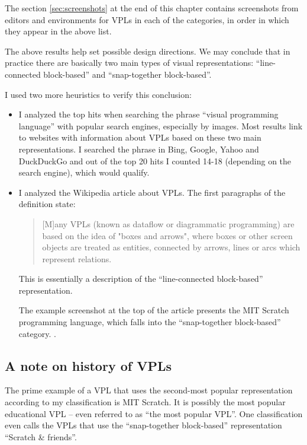 The section \ref{sec:screenshots} at the end of this chapter contains screenshots from editors and environments for VPLs in each of the categories, in order in which they appear in the above list.

The above results help set possible design directions. We may conclude that in practice there are basically two main types of visual representations: ``line-connected block-based'' and ``snap-together block-based''.

I used two more heuristics to verify this conclusion:
\begin{itemize}
    \item I analyzed the top hits when searching the phrase ``visual programming language'' with popular search engines, especially by images. Most results link to websites with information about VPLs based on these two main representations. I searched the phrase in Bing, Google, Yahoo and DuckDuckGo and out of the top 20 hits I counted 14-18 (depending on the search engine), which would qualify.
    
    \item I analyzed the Wikipedia article about VPLs\cite{vpl_wikipedia}. The first paragraphs of the definition state:
    \begin{quote}
        [M]any VPLs (known as dataflow or diagrammatic programming)\cite{381508} are based on the idea of "boxes and arrows", where boxes or other screen objects are treated as entities, connected by arrows, lines or arcs which represent relations.
    \end{quote}
    
    This is essentially a description of the ``line-connected block-based'' representation.
    
    The example screenshot at the top of the article presents the MIT Scratch programming language, which falls into the ``snap-together block-based'' category. \cite[Section~VPL-II.B]{visual_languages}.
\end{itemize}

\subsection{A note on history of VPLs}
The prime example of a VPL that uses the second-most popular representation according to my classification is MIT Scratch. It is possibly the most popular educational VPL\cite[Section~Community of users]{scratch_wikipedia} -- even referred to as ``the most popular VPL''\cite{vpl_infograph}. One classification even calls the VPLs that use the ``snap-together block-based'' representation ``Scratch \& friends''\cite[Section~Types~of~VPLs]{vpl_maturity}.

